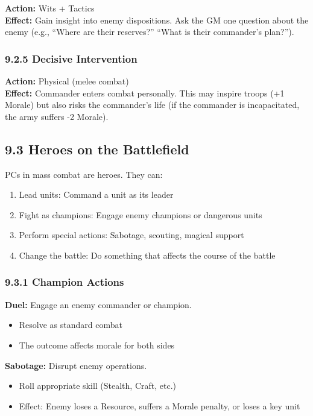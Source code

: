 \documentclass[11pt]{article}
\begin{document}
\textbf{Action:} Wits + Tactics\\
\textbf{Effect:} Gain insight into enemy dispositions. Ask the GM one question about the enemy (e.g., ``Where are their reserves?'' ``What is their commander's plan?'').

\subsubsection{9.2.5 Decisive Intervention}

\textbf{Action:} Physical (melee combat)\\
\textbf{Effect:} Commander enters combat personally. This may inspire troops (+1 Morale) but also risks the commander's life (if the commander is incapacitated, the army suffers -2 Morale).

\subsection{9.3 Heroes on the Battlefield}

PCs in mass combat are heroes. They can:
\begin{enumerate}
  \item Lead units: Command a unit as its leader
  \item Fight as champions: Engage enemy champions or dangerous units
  \item Perform special actions: Sabotage, scouting, magical support
  \item Change the battle: Do something that affects the course of the battle
\end{enumerate}

\subsubsection{9.3.1 Champion Actions}

\textbf{Duel:} Engage an enemy commander or champion.
\begin{itemize}
  \item Resolve as standard combat
  \item The outcome affects morale for both sides
\end{itemize}

\textbf{Sabotage:} Disrupt enemy operations.
\begin{itemize}
  \item Roll appropriate skill (Stealth, Craft, etc.)
  \item Effect: Enemy loses a Resource, suffers a Morale penalty, or loses a key unit
\end{itemize}
\end{document}
